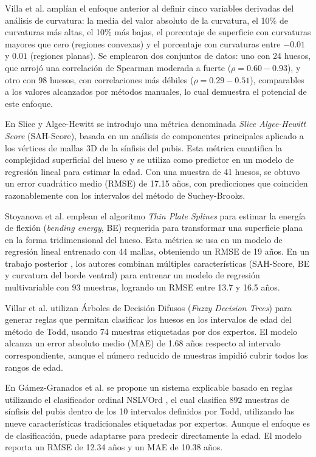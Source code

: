 Villa et al. \cite{villa2015quantitative} amplían el enfoque anterior al definir cinco variables derivadas del análisis de curvatura: la media del valor absoluto de la curvatura, el 10\% de curvaturas más altas, el 10\% más bajas, el porcentaje de superficie con curvaturas mayores que cero (regiones convexas) y el porcentaje con curvaturas entre $-0.01$ y $0.01$ (regiones planas). Se emplearon dos conjuntos de datos: uno con 24 huesos, que arrojó una correlación de Spearman moderada a fuerte ($\rho=0.60-0.93$), y otro con 98 huesos, con correlaciones más débiles ($\rho=0.29-0.51$), comparables a los valores alcanzados por métodos manuales, lo cual demuestra el potencial de este enfoque.

En Slice y Algee-Hewitt \cite{slice2015modeling} se introdujo una métrica denominada \textit{Slice Algee-Hewitt Score} (SAH-Score), basada en un análisis de componentes principales aplicado a los vértices de mallas 3D de la sínfisis del pubis. Esta métrica cuantifica la complejidad superficial del hueso y se utiliza como predictor en un modelo de regresión lineal para estimar la edad. Con una muestra de 41 huesos, se obtuvo un error cuadrático medio (RMSE) de 17.15 años, con predicciones que coinciden razonablemente con los intervalos del método de Suchey-Brooks.

Stoyanova et al. \cite{stoyanova2015enhanced} emplean el algoritmo \textit{Thin Plate Splines} para estimar la energía de flexión (\textit{bending energy}, BE) requerida para transformar una superficie plana en la forma tridimensional del hueso. Esta métrica se usa en un modelo de regresión lineal entrenado con 44 mallas, obteniendo un RMSE de 19 años. En un trabajo posterior \cite{stoyanova2017computational}, los autores combinan múltiples características (SAH-Score, BE y curvatura del borde ventral) para entrenar un modelo de regresión multivariable con 93 muestras, logrando un RMSE entre 13.7 y 16.5 años.

Villar et al. \cite{villar2017first} utilizan Árboles de Decisión Difusos (\textit{Fuzzy Decision Trees}) para generar reglas que permitan clasificar los huesos en los intervalos de edad del método de Todd, usando 74 muestras etiquetadas por dos expertos. El modelo alcanza un error absoluto medio (MAE) de 1.68 años respecto al intervalo correspondiente, aunque el número reducido de muestras impidió cubrir todos los rangos de edad.

En Gámez-Granados et al. \cite{granados} se propone un sistema explicable basado en reglas utilizando el clasificador ordinal NSLVOrd \cite{gamez2016ordinal}, el cual clasifica 892 muestras de sínfisis del pubis dentro de los 10 intervalos definidos por Todd, utilizando las nueve características tradicionales etiquetadas por expertos. Aunque el enfoque es de clasificación, puede adaptarse para predecir directamente la edad. El modelo reporta un RMSE de 12.34 años y un MAE de 10.38 años.

